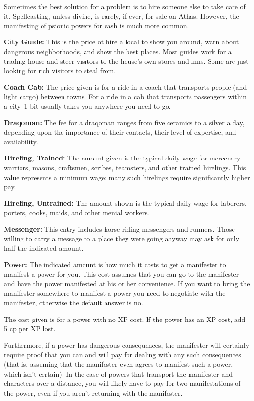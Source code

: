 {\\
}

Sometimes the best solution for a problem is to hire someone else to take care of it. Spellcasting, unless divine, is rarely, if ever, for sale on Athas. However, the manifesting of psionic powers for cash is much more common.

\textbf{City Guide:} This is the price ot hire a local to show you around, warn about dangerous neighborhoods, and show the best places. Most guides work for a trading house and steer visitors to the house's own stores and inns. Some are just looking for rich visitors to steal from.

\textbf{Coach Cab:} The price given is for a ride in a coach that transports people (and light cargo) between towns. For a ride in a cab that transports passengers within a city, 1 bit usually takes you anywhere you need to go.

\textbf{Draqoman:} The fee for a draqoman ranges from five ceramics to a silver a day, depending upon the importance of their contacts, their level of expertise, and availability.

\textbf{Hireling, Trained:} The amount given is the typical daily wage for mercenary warriors, masons, craftsmen, scribes, teamsters, and other trained hirelings. This value represents a minimum wage; many such hirelings require significantly higher pay.

\textbf{Hireling, Untrained:} The amount shown is the typical daily wage for laborers, porters, cooks, maids, and other menial workers.

\textbf{Messenger:} This entry includes horse-riding messengers and runners. Those willing to carry a message to a place they were going anyway may ask for only half the indicated amount.

\textbf{Power:} The indicated amount is how much it costs to get a manifester to manifest a power for you. This cost assumes that you can go to the manifester and have the power manifested at his or her convenience. If you want to bring the manifester somewhere to manifest a power you need to negotiate with the manifester, otherwise the default answer is no.

The cost given is for a power with no XP cost. If the power has an XP cost, add 5 cp per XP lost.

Furthermore, if a power has dangerous consequences, the manifester will certainly require proof that you can and will pay for dealing with any such consequences (that is, assuming that the manifester even agrees to manifest such a power, which isn't certain). In the case of powers that transport the manifester and characters over a distance, you will likely have to pay for two manifestations of the power, even if you aren't returning with the manifester.

